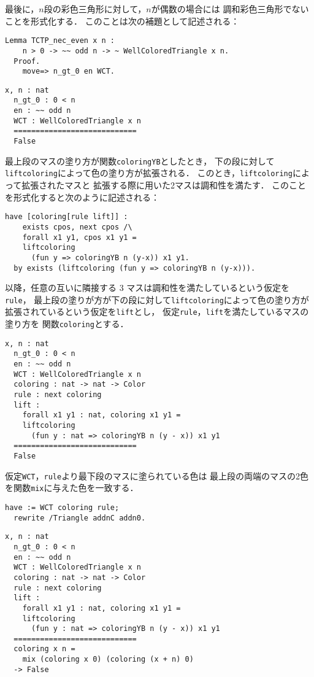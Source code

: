 最後に，$n$段の彩色三角形に対して，$n$が偶数の場合には
調和彩色三角形でないことを形式化する．
このことは次の補題として記述される：
\begin{lstlisting}[language=Coq]
  Lemma TCTP_nec_even x n :
    n > 0 -> ~~ odd n -> ~ WellColoredTriangle x n.
  Proof.
    move=> n_gt_0 en WCT.
\end{lstlisting}
\begin{lstlisting}[language=Coq]
  x, n : nat
  n_gt_0 : 0 < n
  en : ~~ odd n
  WCT : WellColoredTriangle x n
  ============================
  False
\end{lstlisting}
最上段のマスの塗り方が関数{\tt{coloringYB}}としたとき，
下の段に対して{\tt{liftcoloring}}によって色の塗り方が拡張される．
このとき，{\tt{liftcoloring}}によって拡張されたマスと
拡張する際に用いた2マスは調和性を満たす．
このことを形式化すると次のように記述される：
\begin{lstlisting}[language=Coq]
  have [coloring[rule lift]] :
    exists cpos, next cpos /\
    forall x1 y1, cpos x1 y1 =
    liftcoloring
      (fun y => coloringYB n (y-x)) x1 y1.
  by exists (liftcoloring (fun y => coloringYB n (y-x))).
\end{lstlisting}
以降，任意の互いに隣接する 3 マスは調和性を満たしているという仮定を{\tt{rule}}，
最上段の塗りが方が下の段に対して{\tt{liftcoloring}}によって色の塗り方が
拡張されているという仮定を{\tt{lift}}とし，
仮定{\tt{rule}}，{\tt{lift}}を満たしているマスの塗り方を
関数{\tt{coloring}}とする．
\begin{lstlisting}[language=Coq]
  x, n : nat
  n_gt_0 : 0 < n
  en : ~~ odd n
  WCT : WellColoredTriangle x n
  coloring : nat -> nat -> Color
  rule : next coloring
  lift :
    forall x1 y1 : nat, coloring x1 y1 =
    liftcoloring
      (fun y : nat => coloringYB n (y - x)) x1 y1
  ============================
  False
\end{lstlisting}
仮定{\tt{WCT}}，{\tt{rule}}より最下段のマスに塗られている色は
最上段の両端のマスの2色を関数{\tt{mix}}に与えた色を一致する．
\begin{lstlisting}[language=Coq]
  have := WCT coloring rule;
  rewrite /Triangle addnC addn0.
\end{lstlisting}
\begin{lstlisting}[language=Coq]
  x, n : nat
  n_gt_0 : 0 < n
  en : ~~ odd n
  WCT : WellColoredTriangle x n
  coloring : nat -> nat -> Color
  rule : next coloring
  lift :
    forall x1 y1 : nat, coloring x1 y1 =
    liftcoloring
      (fun y : nat => coloringYB n (y - x)) x1 y1
  ============================
  coloring x n =
    mix (coloring x 0) (coloring (x + n) 0)
  -> False
\end{lstlisting}
